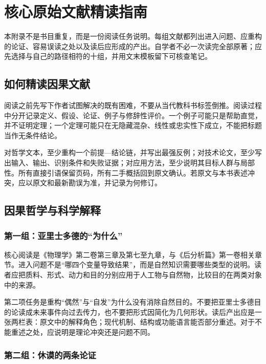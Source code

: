 \chapter{核心原始文献精读指南}
\label{app:primary-reading}

本附录不是书目重复，而是一份阅读任务说明。每组文献都列出进入问题、应重构的论证、容易误读之处以及读后应形成的产出。自学者不必一次读完全部原著；应先选择与自己的路径相符的十组，并用文末模板留下可核查笔记。

\section{如何精读因果文献}

阅读之前先写下作者试图解决的既有困难，不要从当代教科书标签倒推。阅读过程中分开记录定义、假设、论证、例子与修辞性评价。一个例子可能只是帮助直觉，并不证明定理；一个定理可能只在无隐藏混杂、线性或忠实性下成立，不能把标题当作无条件结论。

对哲学文本，至少重构一个前提---结论链，并写出最强反例；对技术论文，至少写出输入、输出、识别条件和失败证据；对应用方法，至少说明其目标人群与局部性。所有直接引语保留页码，所有二手概括回到原文确认。若原文与本书表述冲突，应以原文和最新勘误为准，并记录为何修订。

\section{因果哲学与科学解释}

\subsection*{第一组：亚里士多德的“为什么”}

核心阅读是《物理学》第二卷第三章及第七至九章，与《后分析篇》第一卷相关章节\parencite{aristotlePhysics,aristotlePosterior}。进入问题不是“哪四个变量导致结果”，而是自然知识需要哪些类型的说明。读者应把质料、形式、动力和目的分别应用于人工物与自然物，比较目的在两类对象中的来源。

第二项任务是重构“偶然”与“自发”为什么没有消除自然目的。不要把亚里士多德目的论读成未来事件向过去传力，也不要把形式因简化为几何形状。读后产出应是一张两栏表：原文中的解释角色；现代机制、结构或功能语言能否部分重述。对于不能重述之处，应说明是理论冲突还是问题不同。

\subsection*{第二组：休谟的两条论证}

